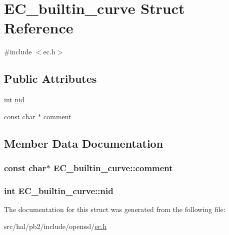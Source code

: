 \hypertarget{struct_e_c__builtin__curve}{}\section{E\+C\+\_\+builtin\+\_\+curve Struct Reference}
\label{struct_e_c__builtin__curve}


{\ttfamily \#include $<$ec.\+h$>$}

\subsection*{Public Attributes}
\begin{DoxyCompactItemize}
\item 
int \hyperlink{struct_e_c__builtin__curve_a31dc38a7d4ada38cd9249b87fb5d8f20}{nid}
\item 
const char $\ast$ \hyperlink{struct_e_c__builtin__curve_a1c394e4731adad55a8fdc5ed25400ab1}{comment}
\end{DoxyCompactItemize}


\subsection{Member Data Documentation}
\subsubsection[{\texorpdfstring{comment}{comment}}]{\setlength{\rightskip}{0pt plus 5cm}const char$\ast$ E\+C\+\_\+builtin\+\_\+curve\+::comment}\hypertarget{struct_e_c__builtin__curve_a1c394e4731adad55a8fdc5ed25400ab1}{}\label{struct_e_c__builtin__curve_a1c394e4731adad55a8fdc5ed25400ab1}
\subsubsection[{\texorpdfstring{nid}{nid}}]{\setlength{\rightskip}{0pt plus 5cm}int E\+C\+\_\+builtin\+\_\+curve\+::nid}\hypertarget{struct_e_c__builtin__curve_a31dc38a7d4ada38cd9249b87fb5d8f20}{}\label{struct_e_c__builtin__curve_a31dc38a7d4ada38cd9249b87fb5d8f20}


The documentation for this struct was generated from the following file\+:\begin{DoxyCompactItemize}
\item 
src/hal/pb2/include/openssl/\hyperlink{ec_8h}{ec.\+h}\end{DoxyCompactItemize}
